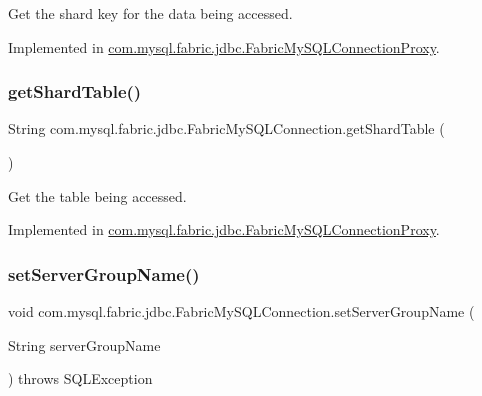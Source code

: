 Get the shard key for the data being accessed. 

Implemented in \mbox{\hyperlink{classcom_1_1mysql_1_1fabric_1_1jdbc_1_1_fabric_my_s_q_l_connection_proxy_a10e5d6a447e761dbc2bf2c84485036fe}{com.\+mysql.\+fabric.\+jdbc.\+Fabric\+My\+S\+Q\+L\+Connection\+Proxy}}.

\mbox{\label{interfacecom_1_1mysql_1_1fabric_1_1jdbc_1_1_fabric_my_s_q_l_connection_ae6b5717b5aac5a32d46b5fce83de74d7}} 
\subsubsection{\texorpdfstring{get\+Shard\+Table()}{getShardTable()}}
{\footnotesize\ttfamily String com.\+mysql.\+fabric.\+jdbc.\+Fabric\+My\+S\+Q\+L\+Connection.\+get\+Shard\+Table (\begin{DoxyParamCaption}{ }\end{DoxyParamCaption})}

Get the table being accessed. 

Implemented in \mbox{\hyperlink{classcom_1_1mysql_1_1fabric_1_1jdbc_1_1_fabric_my_s_q_l_connection_proxy_ae176bb68596e935c8484d85611116c81}{com.\+mysql.\+fabric.\+jdbc.\+Fabric\+My\+S\+Q\+L\+Connection\+Proxy}}.

\mbox{\label{interfacecom_1_1mysql_1_1fabric_1_1jdbc_1_1_fabric_my_s_q_l_connection_a934f2eca033d68725f572ceab4585efc}} 
\subsubsection{\texorpdfstring{set\+Server\+Group\+Name()}{setServerGroupName()}}
{\footnotesize\ttfamily void com.\+mysql.\+fabric.\+jdbc.\+Fabric\+My\+S\+Q\+L\+Connection.\+set\+Server\+Group\+Name (\begin{DoxyParamCaption}\item[{String}]{server\+Group\+Name }\end{DoxyParamCaption}) throws S\+Q\+L\+Exception}

